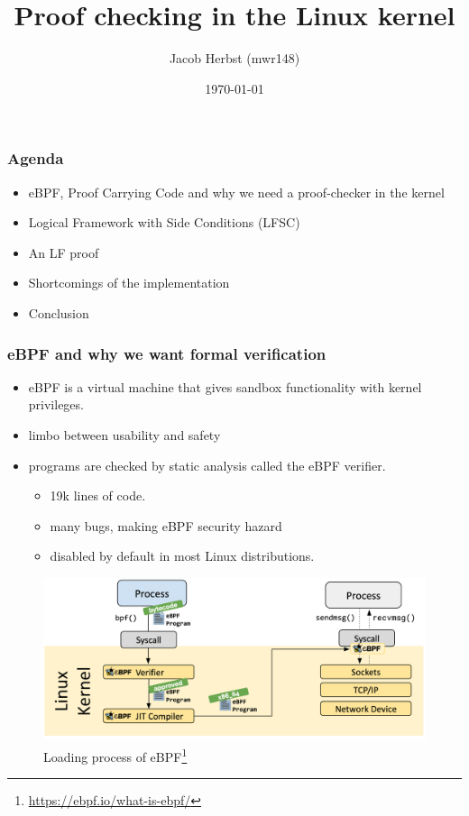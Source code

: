 \documentclass[10pt,t]{beamer}
\title{Proof checking in the Linux kernel}
\subtitle{}
\author{Jacob Herbst (mwr148)}
\institute[DIKU]{Institute of Computer Science (DIKU)}
\date[]{\today}
\begin{document}
\frame[plain]{\titlepage}

\begin{frame}[c]
  \begin{center}
  \frametitle{Agenda}
  \begin{itemize}
    \item eBPF, Proof Carrying Code and why we need a proof-checker in the kernel
    \item Logical Framework with Side Conditions (LFSC)
    \item An LF proof
    \item Shortcomings of the implementation
    \item Conclusion
  \end{itemize}
\end{center}
\end{frame}

\begin{frame}[containsverbatim]
  \frametitle{eBPF and why we want formal verification}
  \begin{itemize}
    \item eBPF is a virtual machine that gives sandbox functionality with kernel privileges.
    \item limbo between usability and safety
    \item programs are checked by static analysis called the eBPF verifier.
          \begin{itemize}
            \item 19k lines of code.
            \item many bugs, making eBPF security hazard
            \item disabled by default in most Linux distributions.
          \end{itemize}
  \end{itemize}
  \begin{figure}
    \includegraphics[width=.65\linewidth]{loader.png}
    \caption{Loading process of eBPF\footnote{\url{https://ebpf.io/what-is-ebpf/}} }
  \end{figure}
\end{frame}
\end{document}
